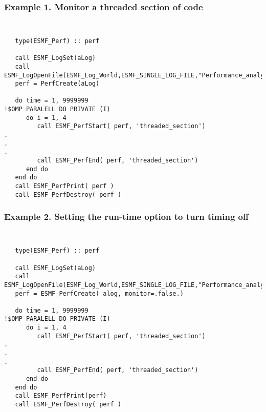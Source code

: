 %



\subsubsection{Example 1. Monitor a threaded section of code}
{\tt
\begin{verbatim}
   type(ESMF_Perf) :: perf

   call ESMF_LogSet(aLog)
   call ESMF_LogOpenFile(ESMF_Log_World,ESMF_SINGLE_LOG_FILE,"Performance_analysis.txt")
   perf = PerfCreate(aLog)

   do time = 1, 9999999
!$OMP PARALELL DO PRIVATE (I)
      do i = 1, 4
         call ESMF_PerfStart( perf, 'threaded_section')
.
.
.
         call ESMF_PerfEnd( perf, 'threaded_section')
      end do
   end do
   call ESMF_PerfPrint( perf )
   call ESMF_PerfDestroy( perf )
\end{verbatim}
}
\subsubsection{Example 2. Setting the run-time option to turn timing off}
{\tt
\begin{verbatim}
   type(ESMF_Perf) :: perf

   call ESMF_LogSet(aLog)
   call ESMF_LogOpenFile(ESMF_Log_World,ESMF_SINGLE_LOG_FILE,"Performance_analysis.txt")
   perf = ESMF_PerfCreate( alog, monitor=.false.)

   do time = 1, 9999999
!$OMP PARALELL DO PRIVATE (I)
      do i = 1, 4
         call ESMF_PerfStart( perf, 'threaded_section')
.
.
.
         call ESMF_PerfEnd( perf, 'threaded_section')
      end do
   end do
   call ESMF_PerfPrint(perf)
   call ESMF_PerfDestroy( perf )
\end{verbatim}
}
